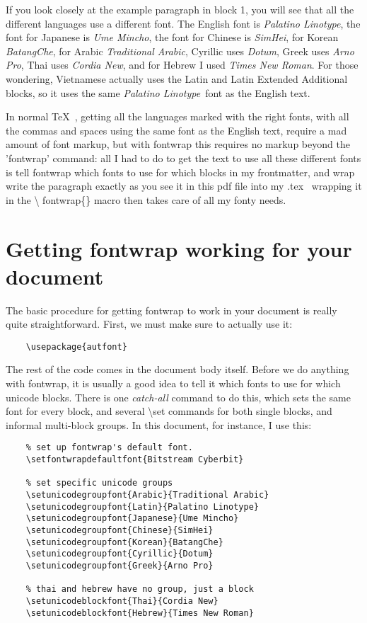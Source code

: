 \documentclass[12pt]{article}
\begin{document}
  If you look closely at the example paragraph in block 1, you will see that all
  the different languages use a different font. The English font is \emph{Palatino
  Linotype}, the font for Japanese is \emph{Ume Mincho}, the font for Chinese is
  \emph{SimHei}, for Korean \emph{BatangChe}, for Arabic \emph{Traditional Arabic},
  Cyrillic uses \emph{Dotum}, Greek uses \emph{Arno Pro}, Thai uses \emph{Cordia New},
  and for Hebrew I used \emph{Times New Roman}. For those wondering, Vietnamese
  actually uses the Latin and Latin Extended Additional blocks, so it uses the same
  \emph{Palatino Linotype}\ font as the English text.
  
  In normal \TeX\ , getting all the languages marked with the right fonts, with all
  the commas and spaces using the same font as the English text, require a mad amount
  of font markup, but with fontwrap this requires no markup beyond the 'fontwrap' command:
  all I had to do to get the text to use all these different fonts is tell fontwrap which
  fonts to use for which blocks in my frontmatter, and wrap write the paragraph exactly as
  you see it in this pdf file into my .tex \textemdash\ wrapping it in the \textbackslash
  fontwrap\{\} macro then takes care of all my fonty needs.
  
  \section{Getting fontwrap working for your document}
  
  The basic procedure for getting fontwrap to work in your document is really
  quite straightforward. First, we must make sure to actually use it:
  
  \begin{verbatim}
    \usepackage{autfont}
  \end{verbatim}
  
  The rest of the code comes in the document body itself. Before we do anything
  with fontwrap, it is usually a good idea to tell it which fonts to use for
  which unicode blocks. There is one \emph{catch-all} command to do this, which
  sets the same font for every block, and several \textbackslash set commands for
  both single blocks, and informal multi-block groups. In this document, for
  instance, I use this:
  
  \begin{verbatim}
    % set up fontwrap's default font.
    \setfontwrapdefaultfont{Bitstream Cyberbit}

    % set specific unicode groups
    \setunicodegroupfont{Arabic}{Traditional Arabic}
    \setunicodegroupfont{Latin}{Palatino Linotype}
    \setunicodegroupfont{Japanese}{Ume Mincho}
    \setunicodegroupfont{Chinese}{SimHei}
    \setunicodegroupfont{Korean}{BatangChe}
    \setunicodegroupfont{Cyrillic}{Dotum}
    \setunicodegroupfont{Greek}{Arno Pro}
    
    % thai and hebrew have no group, just a block
    \setunicodeblockfont{Thai}{Cordia New}
    \setunicodeblockfont{Hebrew}{Times New Roman}
  \end{verbatim}
  
\end{document}
